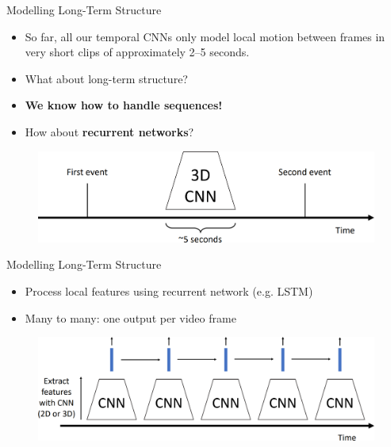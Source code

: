 \begin{frame}{Modelling Long-Term Structure}
    \begin{itemize}
        \item So far, all our temporal CNNs only model local motion between frames in very short clips of approximately 2--5 seconds.
        \item What about long-term structure?
        \item<2-> \textbf{We know how to handle sequences!}
        \item<2-> How about \textbf{recurrent networks}?
    \end{itemize}
    \begin{figure}
        \centering
        \includegraphics[width=1\textwidth,height=0.5\textheight,keepaspectratio]{images/video/slide_25_1_img.png}
    \end{figure}
\end{frame}

\begin{frame}{Modelling Long-Term Structure}
    \begin{itemize}
        \item Process local features using recurrent network (e.g. LSTM)
        \item Many to many: one output per video frame
    \end{itemize}
    \begin{figure}
        \centering
        \includegraphics[width=1\textwidth,height=0.5\textheight,keepaspectratio]{images/video/slide_27_1_img.png}
    \end{figure}
\end{frame}

